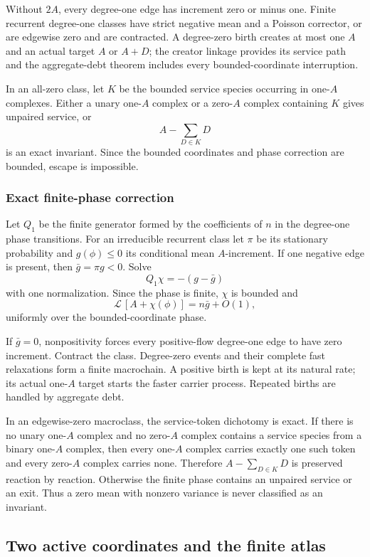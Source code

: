 \documentclass[11pt]{article}
\newcommand{\cL}{\mathcal L}
\begin{document}
Without \(2A\), every degree-one edge has increment zero or minus one.
Finite recurrent degree-one classes have strict negative mean and a Poisson
corrector, or are edgewise zero and are contracted.  A degree-zero birth
creates at most one \(A\) and an actual target \(A\) or \(A+D\); the creator
linkage provides its service path and the aggregate-debt theorem includes
every bounded-coordinate interruption.

In an all-zero class, let \(K\) be the bounded service species occurring in
one-\(A\) complexes.  Either a unary one-\(A\) complex or a zero-\(A\)
complex containing \(K\) gives unpaired service, or
\[
 A-\sum_{D\in K}D
\]
is an exact invariant.  Since the bounded coordinates and phase correction
are bounded, escape is impossible.


\subsubsection{Exact finite-phase correction}

Let \(Q_1\) be the finite generator formed by the coefficients of \(n\) in
the degree-one phase transitions.  For an irreducible recurrent class let
\(\pi\) be its stationary probability and \(g(\phi)\le0\) its conditional
mean \(A\)-increment.  If one negative edge is present, then
\(\bar g=\pi g<0\).  Solve
\[
 Q_1\chi=-(g-\bar g)
\]
with one normalization.  Since the phase is finite, \(\chi\) is bounded and
\[
 \cL\,[A+\chi(\phi)]=n\bar g+O(1),
\]
uniformly over the bounded-coordinate phase.

If \(\bar g=0\), nonpositivity forces every positive-flow degree-one edge to
have zero increment.  Contract the class.  Degree-zero events and their
complete fast relaxations form a finite macrochain.  A positive birth is
kept at its natural rate; its actual one-\(A\) target starts the faster
carrier process.  Repeated births are handled by aggregate debt.

In an edgewise-zero macroclass, the service-token dichotomy is exact.  If
there is no unary one-\(A\) complex and no zero-\(A\) complex contains a
service species from a binary one-\(A\) complex, then every one-\(A\)
complex carries exactly one such token and every zero-\(A\) complex carries
none.  Therefore \(A-\sum_{D\in K}D\) is preserved reaction by reaction.
Otherwise the finite phase contains an unpaired service or an exit.  Thus a
zero mean with nonzero variance is never classified as an invariant.

\subsection{Two active coordinates and the finite atlas}
\end{document}
